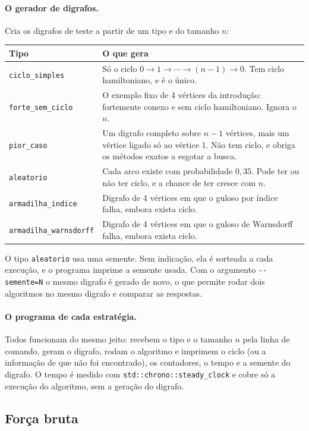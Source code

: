 \documentclass[12pt,a4paper]{article}
\begin{document}
\paragraph{O gerador de digrafos.} Cria os digrafos de teste a partir de um tipo e do tamanho $n$:
\begin{center}
\small
\begin{tabular}{p{4.7cm} p{8.6cm}}
\toprule
Tipo & O que gera\\
\midrule
\texttt{ciclo\_simples} & Só o ciclo $0\to1\to\cdots\to(n-1)\to0$. Tem ciclo hamiltoniano, e é o único.\\
\texttt{forte\_sem\_ciclo} & O exemplo fixo de 4 vértices da introdução: fortemente conexo e sem ciclo hamiltoniano. Ignora o $n$.\\
\texttt{pior\_caso} & Um digrafo completo sobre $n-1$ vértices, mais um vértice ligado só ao vértice 1. Não tem ciclo, e obriga os métodos exatos a esgotar a busca.\\
\texttt{aleatorio} & Cada arco existe com probabilidade $0{,}35$. Pode ter ou não ter ciclo, e a chance de ter cresce com $n$.\\
\texttt{armadilha\_indice} & Digrafo de 4 vértices em que o guloso por índice falha, embora exista ciclo.\\
\texttt{armadilha\_warnsdorff} & Digrafo de 4 vértices em que o guloso de Warnsdorff falha, embora exista ciclo.\\
\bottomrule
\end{tabular}
\end{center}
O tipo \texttt{aleatorio} usa uma semente. Sem indicação, ela é sorteada a cada execução, e o programa imprime a semente usada. Com o argumento \texttt{-{}-semente=N} o mesmo digrafo é gerado de novo, o que permite rodar dois algoritmos no mesmo digrafo e comparar as respostas.

\paragraph{O programa de cada estratégia.} Todos funcionam do mesmo jeito: recebem o tipo e o tamanho $n$ pela linha de comando, geram o digrafo, rodam o algoritmo e imprimem o ciclo (ou a informação de que não foi encontrado), os contadores, o tempo e a semente do digrafo. O tempo é medido com \texttt{std::chrono::steady\_clock} e cobre só a execução do algoritmo, sem a geração do digrafo.

\subsection{Força bruta}
\end{document}
